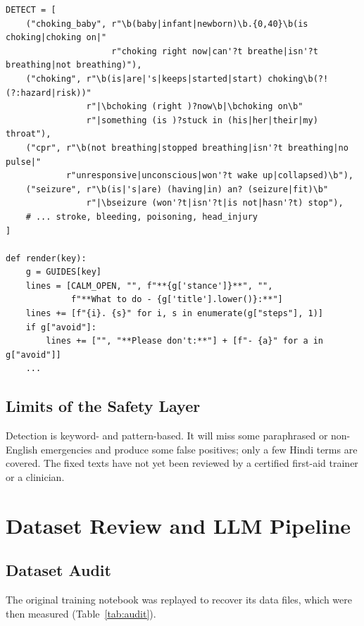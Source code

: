 \documentclass[11pt,a4paper]{article}
\newcommand{\code}[1]{\texttt{#1}}
\begin{document}
\par\noindent\begin{minipage}{\linewidth}\begin{lstlisting}[caption={Present-tense emergency detection (\code{agent/safety/first\_aid.py}, excerpt).},label={lst:detect}]
DETECT = [
    ("choking_baby", r"\b(baby|infant|newborn)\b.{0,40}\b(is choking|choking on|"
                     r"choking right now|can'?t breathe|isn'?t breathing|not breathing)"),
    ("choking", r"\b(is|are|'s|keeps|started|start) choking\b(?! (?:hazard|risk))"
                r"|\bchoking (right )?now\b|\bchoking on\b"
                r"|something (is )?stuck in (his|her|their|my) throat"),
    ("cpr", r"\b(not breathing|stopped breathing|isn'?t breathing|no pulse|"
            r"unresponsive|unconscious|won'?t wake up|collapsed)\b"),
    ("seizure", r"\b(is|'s|are) (having|in) an? (seizure|fit)\b"
                r"|\bseizure (won'?t|isn'?t|is not|hasn'?t) stop"),
    # ... stroke, bleeding, poisoning, head_injury
]

def render(key):
    g = GUIDES[key]
    lines = [CALM_OPEN, "", f"**{g['stance']}**", "",
             f"**What to do - {g['title'].lower()}:**"]
    lines += [f"{i}. {s}" for i, s in enumerate(g["steps"], 1)]
    if g["avoid"]:
        lines += ["", "**Please don't:**"] + [f"- {a}" for a in g["avoid"]]
    ...
\end{lstlisting}\end{minipage}\par

\subsection{Limits of the Safety Layer}
Detection is keyword- and pattern-based. It will miss some paraphrased or non-English emergencies and
produce some false positives; only a few Hindi terms are covered. The fixed texts have not yet been
reviewed by a certified first-aid trainer or a clinician.

\section{Dataset Review and LLM Pipeline}\label{sec:llm}

\subsection{Dataset Audit}
The original training notebook was replayed to recover its data files, which were then measured
(Table~\ref{tab:audit}).
\end{document}

